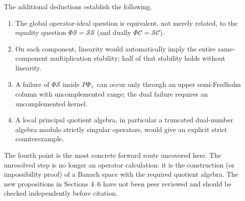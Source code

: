 \documentclass[11pt]{article}
\theoremstyle{definition}
\newcommand{\SSing}{\mathcal{SS}}
\newcommand{\SCos}{\mathcal{SC}}
\newcommand{\PhiS}{\Phi\mathcal S}
\newcommand{\PhiC}{\Phi\mathcal C}
\newcommand{\PPhiP}{P\Phi_+}
\begin{document}
The additional deductions establish the following.
\begin{enumerate}[leftmargin=2em]
\item The global operator-ideal question is equivalent, not merely related, to the equality
question \(\PhiS=\SSing\) (and dually \(\PhiC=\SCos\)).
\item On each component, linearity would automatically imply the entire same-component
multiplication stability; half of that stability holds without linearity.
\item A failure of \(\PhiS\) inside \(\PPhiP\) can occur only through an upper
semi-Fredholm column with uncomplemented range; the dual failure requires an
uncomplemented kernel.
\item A local principal quotient algebra, in particular a truncated dual-number algebra
modulo strictly singular operators, would give an explicit strict counterexample.
\end{enumerate}

The fourth point is the most concrete forward route uncovered here.  The unresolved step
is no longer an operator calculation: it is the construction (or impossibility proof) of a
Banach space with the required quotient algebra.  The new propositions in Sections 4--6
have not been peer reviewed and should be checked independently before citation.
\end{document}
